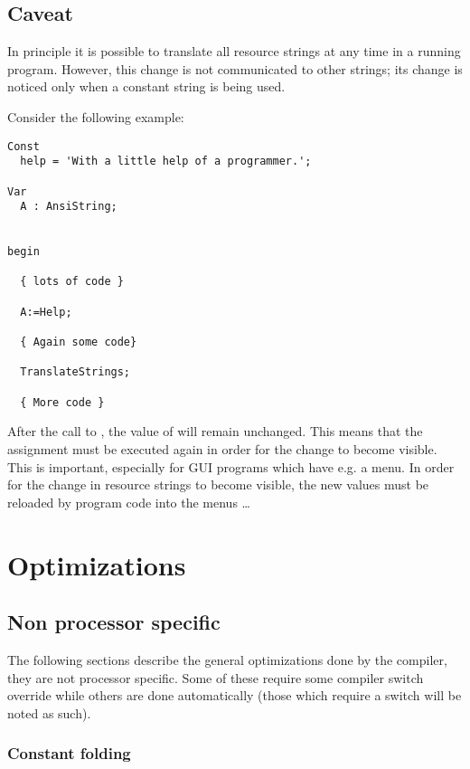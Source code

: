 \section{Caveat}
In principle it is possible to translate all resource strings at any time in
a running program. However, this change is not communicated to other
strings; its change is noticed only when a constant string is being used.

Consider the following example:
\begin{verbatim}
Const
  help = 'With a little help of a programmer.';

Var
  A : AnsiString;


begin

  { lots of code }

  A:=Help;

  { Again some code}

  TranslateStrings;

  { More code }
\end{verbatim}
After the call to , the value of  will remain
unchanged. This means that the assignment  must be executed
again in order for the change to become visible. This is important,
especially for GUI programs which have e.g. a menu. In order for the
change in resource strings to become visible, the new values must be
reloaded by program code into the menus \dots

\chapter{Optimizations}

\section{Non processor specific}

The following sections describe the general optimizations
done by the compiler, they are not processor specific. Some
of these require some compiler switch override while others are done
automatically (those which require a switch will be noted as such).

\subsection{Constant folding}

